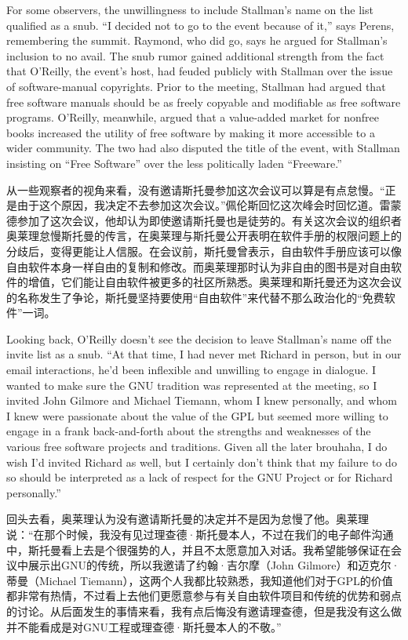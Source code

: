 \ifdefined\eng
For some observers, the unwillingness to include Stallman's name on the list qualified as a snub. ``I decided not to go to the event because of it,'' says Perens, remembering the summit. Raymond, who did go, says he argued for Stallman's inclusion to no avail. The snub rumor gained additional strength from the fact that O'Reilly, the event's host, had feuded publicly with Stallman over the issue of software-manual copyrights. Prior to the meeting, Stallman had argued that free software manuals should be as freely copyable and modifiable as free software programs. O'Reilly, meanwhile, argued that a value-added market for nonfree books increased the utility of free software by making it more accessible to a wider community. The two had also disputed the title of the event, with Stallman insisting on ``Free Software'' over the less politically laden ``Freeware.''
\fi

\ifdefined\chs
从一些观察者的视角来看，没有邀请斯托曼参加这次会议可以算是有点怠慢。``正是由于这个原因，我决定不去参加这次会议。''佩伦斯回忆这次峰会时回忆道。雷蒙德参加了这次会议，他却认为即使邀请斯托曼也是徒劳的。有关这次会议的组织者奥莱理怠慢斯托曼的传言，在奥莱理与斯托曼公开表明在软件手册的权限问题上的分歧后，变得更能让人信服。在会议前，斯托曼曾表示，自由软件手册应该可以像自由软件本身一样自由的复制和修改。而奥莱理那时认为非自由的图书是对自由软件的增值，它们能让自由软件被更多的社区所熟悉。奥莱理和斯托曼还为这次会议的名称发生了争论，斯托曼坚持要使用``自由软件''来代替不那么政治化的``免费软件''一词。
\fi

\ifdefined\eng
Looking back, O'Reilly doesn't see the decision to leave Stallman's name off the invite list as a snub. ``At that time, I had never met Richard in person, but in our email interactions, he'd been inflexible and unwilling to engage in dialogue. I wanted to make sure the GNU tradition was represented at the meeting, so I invited John Gilmore and Michael Tiemann, whom I knew personally, and whom I knew were passionate about the value of the GPL but seemed more willing to engage in a frank back-and-forth about the strengths and weaknesses of the various free software projects and traditions. Given all the later brouhaha, I do wish I'd invited Richard as well, but I certainly don't think that my failure to do so should be interpreted as a lack of respect for the GNU Project or for Richard personally.''
\fi

\ifdefined\chs
回头去看，奥莱理认为没有邀请斯托曼的决定并不是因为怠慢了他。奥莱理说：``在那个时候，我没有见过理查德·斯托曼本人，不过在我们的电子邮件沟通中，斯托曼看上去是个很强势的人，并且不太愿意加入对话。我希望能够保证在会议中展示出GNU的传统，所以我邀请了约翰·吉尔摩（John Gilmore）和迈克尔·蒂曼（Michael Tiemann），这两个人我都比较熟悉，我知道他们对于GPL的价值都非常有热情，不过看上去他们更愿意参与有关自由软件项目和传统的优势和弱点的讨论。从后面发生的事情来看，我有点后悔没有邀请理查德，但是我没有这么做并不能看成是对GNU工程或理查德·斯托曼本人的不敬。''
\fi

